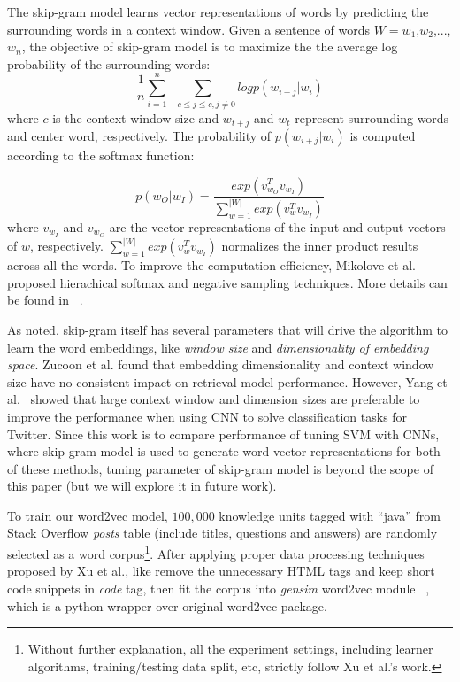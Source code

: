 \documentclass[sigconf,review, anonymous]{acmart}
\theoremstyle{break}
\begin{document}
The skip-gram model learns vector representations of words
 by predicting the surrounding words in a context window. 
 Given a sentence of words $W =w_1$,$w_2$,...,$w_n$, the objective of skip-gram model is to maximize the
 the average log probability of the surrounding words:
 \begin{equation*}
 \frac{1}{n}\sum_{i=1}^{n} \sum_{-c\leq j \leq c, j \neq 0} log p(w_{i+j}|w_i)
\end{equation*}
where $c$ is the context window size and $w_{t+j}$ and $w_{t}$ represent surrounding words and center word, respectively.
The probability of $p(w_{i+j}|w_i)$ is computed according to the softmax function:

\begin{equation*}
p(w_O|w_I) = \frac{exp(v_{w_O}^Tv_{w_I})}{\sum_{w=1}^{|W|}exp(v_{w}^Tv_{w_I})}
\end{equation*}
where $v_{w_I}$ and $v_{w_O}$ are the vector representations of the input and output vectors of $w$, respectively. 
$\sum_{w=1}^{|W|}exp(v_{w}^Tv_{w_I})$  normalizes the inner product results across all the words.
To improve the computation efficiency, Mikolove et al. \cite{mikolov2013distributed} proposed
hierachical softmax and negative sampling
techniques. More details can be found in ~\cite{mikolov2013distributed}.

As noted, skip-gram itself has several parameters that will drive the algorithm 
to learn the word embeddings,  like {\it window size} and {\it dimensionality of embedding space}. 
Zucoon et al. \cite{zuccon2015integrating} found that embedding dimensionality
and context window size have no consistent impact on retrieval model performance. However,
Yang et al.~\cite{yang2016using} showed that large context window and dimension
 sizes are preferable to improve the performance when using CNN to solve  classification tasks
 for Twitter. Since this work is to compare performance of  tuning SVM  with CNNs, where
 skip-gram model is used to generate word vector representations for both of these methods, 
 tuning parameter of skip-gram model is beyond the scope of this paper 
 (but we will explore it in future work).
 
 

To train our word2vec model, $100,000$ knowledge units tagged with ``java'' from
Stack Overflow {\it posts} table  (include titles, questions and answers)
are randomly selected as a word corpus\footnote{Without further explanation, 
all the experiment settings, including learner algorithms,
training/testing data split, etc, strictly follow Xu et al.'s work. }. 
After applying proper data processing techniques proposed by Xu et al., like
 remove the unnecessary HTML tags and keep short code snippets in
{\it code} tag, then fit the corpus into {\it gensim} word2vec module ~\cite{rehurek2010software},
which is a python wrapper over original word2vec package.
\end{document}
